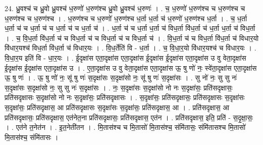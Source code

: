 \documentclass[17pt]{extarticle}
\begin{document}
24. ध्रु॒वश्च॑ च ध्रु॒वो ध्रु॒वश्च॑ ध॒रुणो॑ ध॒रुण॑श्च ध्रु॒वो ध्रु॒वश्च॑ ध॒रुणः॑ । . च॒ ध॒रुणो॑ ध॒रुण॑श्च च ध॒रुण॑श्च च ध॒रुण॑श्च च ध॒रुण॑श्च । . ध॒रुण॑श्च च ध॒रुणो॑ ध॒रुण॑श्च ध॒र्ता ध॒र्ता च॑ ध॒रुणो॑ ध॒रुण॑श्च ध॒र्ता । . च॒ ध॒र्ता ध॒र्ता च॑ च ध॒र्ता च॑ च ध॒र्ता च॑ च ध॒र्ता च॑ । . ध॒र्ता च॑ च ध॒र्ता ध॒र्ता च॑ विध॒र्ता वि॑ध॒र्ता च॑ ध॒र्ता ध॒र्ता च॑ विध॒र्ता । . च॒ वि॒ध॒र्ता वि॑ध॒र्ता च॑ च विध॒र्ता च॑ च विध॒र्ता च॑ च विध॒र्ता च॑ । . वि॒ध॒र्ता च॑ च विध॒र्ता वि॑ध॒र्ता च॑ विधार॒यो वि॑धार॒यश्च॑ विध॒र्ता वि॑ध॒र्ता च॑ विधार॒यः । . वि॒ध॒र्तेति॑ वि - ध॒र्ता । . च॒ वि॒धा॒र॒यो वि॑धार॒यश्च॑ च विधार॒यः । . वि॒धा॒र॒य इति॑ वि - धा॒र॒यः । . ई॒दृक्षा॑स एता॒दृक्षा॑स एता॒दृक्षा॑स ई॒दृक्षा॑स ई॒दृक्षा॑स एता॒दृक्षा॑स उ वु वेता॒दृक्षा॑स ई॒दृक्षा॑स ई॒दृक्षा॑स एता॒दृक्षा॑स उ । . ए॒ता॒दृक्षा॑स उ वु वेता॒दृक्षा॑स एता॒दृक्षा॑स ऊ॒ षु णो॑ नः॒ स्वे॑ता॒दृक्षा॑स एता॒दृक्षा॑स 
ऊ॒ षु णः॑ । . ऊ॒ षु णो॑ नः॒ सू॑ षु णः॑ स॒दृक्षा॑सः स॒दृक्षा॑सो नः॒ सू॑ षु णः॑ स॒दृक्षा॑सः । . सु नो॑ नः॒ सु सु नः॑ स॒दृक्षा॑सः स॒दृक्षा॑सो नः॒ सु सु नः॑ स॒दृक्षा॑सः । . नः॒ स॒दृक्षा॑सः स॒दृक्षा॑सो नो नः स॒दृक्षा॑सः॒ प्रति॑सदृक्षासः॒ प्रति॑सदृक्षासः स॒दृक्षा॑सो नो नः स॒दृक्षा॑सः॒ प्रति॑सदृक्षासः । . स॒दृक्षा॑सः॒ प्रति॑सदृक्षासः॒ प्रति॑सदृक्षासः स॒दृक्षा॑सः स॒दृक्षा॑सः॒ प्रति॑सदृक्षास॒ आ प्रति॑सदृक्षासः स॒दृक्षा॑सः स॒दृक्षा॑सः॒ प्रति॑सदृक्षास॒ आ । . प्रति॑सदृक्षास॒ आ प्रति॑सदृक्षासः॒ प्रति॑सदृक्षास॒ एत॑नेत॒ना प्रति॑सदृक्षासः॒ प्रति॑सदृक्षास॒ एत॑न । . प्रति॑सदृक्षास॒ इति॒ प्रति॑ - स॒दृ॒क्षा॒सः॒ । . एत॑ने त॒नेत॑न । . इ॒त॒नेती॑तन । . मि॒तास॑श्च च मि॒तासो॑ मि॒तास॑श्च॒ संमि॑तासः॒ संमि॑तासश्च मि॒तासो॑ मि॒तास॑श्च॒ संमि॑तासः । \newline
\end{document}
